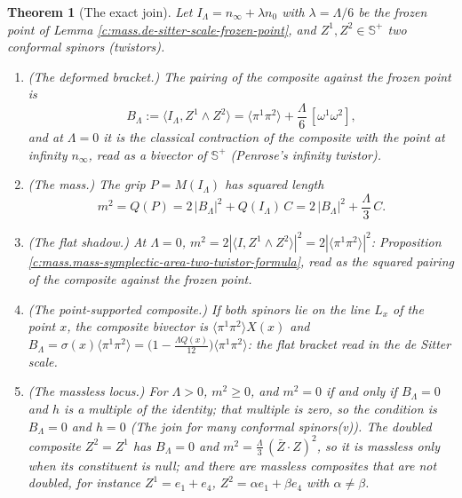 \documentclass[11pt]{article}
\newtheorem{theorem}{Theorem}[section]
\theoremstyle{definition}
\theoremstyle{plain}
\newcommand{\changedmark}[2]{\marginpar{\raggedright\scriptsize\color{#1}#2}}
\providecommand{\CS}{}\renewcommand{\CS}{{\mathbb{S}^{+}}}
\providecommand{\br}{}\renewcommand{\br}[1]{\langle #1\rangle}
\providecommand{\ip}{}\renewcommand{\ip}[2]{\langle #1, #2\rangle}
\begin{document}
\begin{theorem}[The exact join]\label{c:mass.exact-join}
\changedmark{BurntOrange}{changed since the deposit}
Let $I_{\Lambda} = n_{\infty} + \lambda n_{0}$ with $\lambda = \Lambda/6$ be the frozen point of Lemma \ref{c:mass.de-sitter-scale-frozen-point}, and $Z^{1}, Z^{2} \in \CS$ two conformal spinors (twistors).
\begin{enumerate}
\item \emph{(The deformed bracket.)} The pairing of the composite against the frozen point is
\begin{equation}
B_{\Lambda} := \ip{I_{\Lambda}}{Z^{1}\wedge Z^{2}} = \br{\pi^{1}\pi^{2}} + \frac{\Lambda}{6}\,[\omega^{1}\omega^{2}],
\end{equation}
and at $\Lambda = 0$ it is the classical contraction of the composite with the point at infinity $n_{\infty}$, read as a bivector of $\CS$ (Penrose's infinity twistor).
\item \emph{(The mass.)} The grip $P = M(I_{\Lambda})$ has squared length
\begin{equation}
m^{2} = Q(P) = 2\,|B_{\Lambda}|^{2} + Q(I_{\Lambda})\, C = 2\,|B_{\Lambda}|^{2} + \frac{\Lambda}{3}\, C .
\end{equation}
\item \emph{(The flat shadow.)} At $\Lambda = 0$, $m^{2} = 2|\ip{I}{Z^{1}\wedge Z^{2}}|^{2} = 2|\br{\pi^{1}\pi^{2}}|^{2}$: Proposition \ref{c:mass.mass-symplectic-area-two-twistor-formula}, read as the squared pairing of the composite against the frozen point.
\item \emph{(The point-supported composite.)} If both spinors lie on the line $L_{x}$ of the point $x$, the composite bivector is $\br{\pi^{1}\pi^{2}}X(x)$ and $B_{\Lambda} = \sigma(x)\br{\pi^{1}\pi^{2}} = \bigl(1 - \tfrac{\Lambda Q(x)}{12}\bigr)\br{\pi^{1}\pi^{2}}$: the flat bracket read in the de Sitter scale.
\item \emph{(The massless locus.)} For $\Lambda > 0$, $m^{2} \ge 0$, and $m^{2} = 0$ if and only if $B_{\Lambda} = 0$ and $h$ is a multiple of the identity; that multiple is zero, so the condition is $B_{\Lambda} = 0$ and $h = 0$ (\emph{The join for many conformal spinors}(v)). The doubled composite $Z^{2} = Z^{1}$ has $B_{\Lambda} = 0$ and $m^{2} = \tfrac{\Lambda}{3}\,(\bar{Z}\cdot Z)^{2}$, so it is massless only when its constituent is null; and there are massless composites that are not doubled, for instance $Z^{1} = e_{1} + e_{4}$, $Z^{2} = \alpha e_{1} + \beta e_{4}$ with $\alpha \neq \beta$.
\end{enumerate}
\end{theorem}
\end{document}
